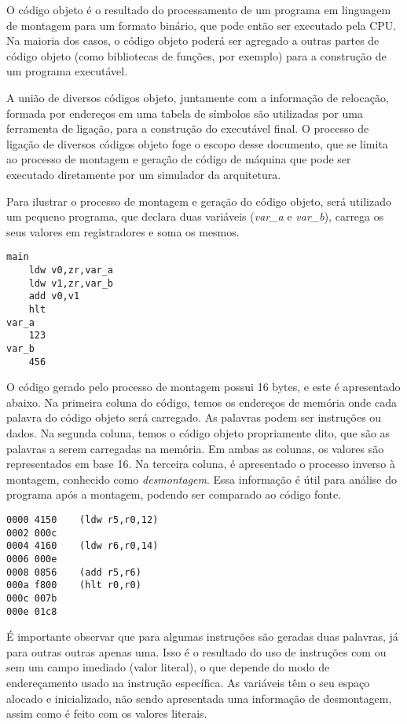 \documentclass[11pt,a4paper]{report}
\begin{document}
O código objeto é o resultado do processamento de um programa em
linguagem de montagem para um formato binário, que pode então ser
executado pela CPU. Na maioria dos casos, o código objeto poderá ser
agregado a outras partes de código objeto (como bibliotecas de funções,
por exemplo) para a construção de um programa executável. 

A união de diversos códigos objeto, juntamente com a informação de relocação,
formada por endereços em uma tabela de símbolos são utilizadas por uma
ferramenta de ligação, para a construção do executável final. O processo
de ligação de diversos códigos objeto foge o escopo desse documento, que
se limita ao processo de montagem e geração de código de máquina que pode
ser executado diretamente por um simulador da arquitetura.

Para ilustrar o processo de montagem e geração do código objeto, será
utilizado um pequeno programa, que declara duas variáveis (\textit{var\_a}
e \textit{var\_b}), carrega os seus valores em registradores e soma os
mesmos.

\begin{verbatim}
main
    ldw v0,zr,var_a
    ldw v1,zr,var_b
    add v0,v1
    hlt
var_a
    123
var_b
    456
\end{verbatim}

O código gerado pelo processo de montagem possui 16 bytes, e este é
apresentado abaixo. Na primeira coluna do código, temos os endereços de
memória onde cada palavra do código objeto será carregado. As palavras
podem ser instruções ou dados. Na segunda coluna, temos o código objeto
propriamente dito, que são as palavras a serem carregadas na memória. Em
ambas as colunas, os valores são representados em base 16. Na terceira
coluna, é apresentado o processo inverso à montagem, conhecido como
\textit{desmontagem}. Essa informação é útil para análise do programa
após a montagem, podendo ser comparado ao código fonte.

\begin{verbatim}
0000 4150    (ldw r5,r0,12)
0002 000c
0004 4160    (ldw r6,r0,14)
0006 000e
0008 0856    (add r5,r6)
000a f800    (hlt r0,r0)
000c 007b
000e 01c8
\end{verbatim}

É importante observar que para algumas instruções são geradas duas
palavras, já para outras outras apenas uma. Isso é o resultado do uso de 
instruções com ou sem um campo imediado (valor literal), o que depende
do modo de endereçamento usado na instrução específica. As variáveis
têm o seu espaço alocado e inicializado, não sendo apresentada uma
informação de desmontagem, assim como é feito com os valores literais.
\end{document}
